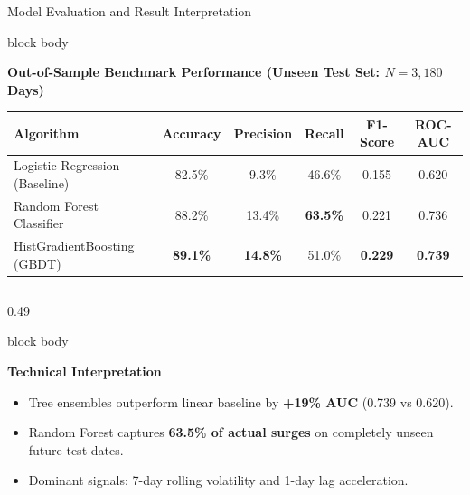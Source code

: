 \documentclass[aspectratio=169, 10pt]{beamer}
\newenvironment{card}[1][]{%
    \begin{beamercolorbox}[rounded=true,shadow=false,wd=\linewidth,sep=4pt,#1]{block body}%
}{%
    \end{beamercolorbox}%
}
\begin{document}
\begin{frame}{Model Evaluation and Result Interpretation}
    \vspace{-0.1cm}
    \begin{card}
        \centering
        {\fontsize{8pt}{9.5pt}\selectfont \textbf{Out-of-Sample Benchmark Performance (Unseen Test Set: $N = 3,180$ Days)}}
        \vspace{0.08cm}
        \footnotesize
        \begin{tabular}{lccccc}
            \toprule
            \textbf{Algorithm} & \textbf{Accuracy} & \textbf{Precision} & \textbf{Recall} & \textbf{F1-Score} & \textbf{ROC-AUC} \\
            \midrule
            Logistic Regression (Baseline) & 82.5\% & 9.3\% & 46.6\% & 0.155 & 0.620 \\
            Random Forest Classifier & 88.2\% & 13.4\% & \textbf{63.5\%} & 0.221 & 0.736 \\
            HistGradientBoosting (GBDT) & \textbf{89.1\%} & \textbf{14.8\%} & 51.0\% & \textbf{0.229} & \textbf{0.739} \\
            \bottomrule
        \end{tabular}
    \end{card}
    \vspace{0.12cm}

    \begin{columns}[T]
        \begin{column}{0.49\textwidth}
            \begin{card}
                {\fontsize{8.5pt}{10pt}\selectfont \textbf{\color{NavyPrimary}Technical Interpretation}}\\[0.06cm]
                \begin{itemize}\setlength{\itemsep}{1.5pt}
                    \item Tree ensembles outperform linear baseline by \textbf{+19\% AUC} (0.739 vs 0.620).
                    \item Random Forest captures \textbf{63.5\% of actual surges} on completely unseen future test dates.
                    \item Dominant signals: 7-day rolling volatility and 1-day lag acceleration.
                \end{itemize}
            \end{card}
        \end{column}


\end{columns}
\end{frame}
\end{document}
